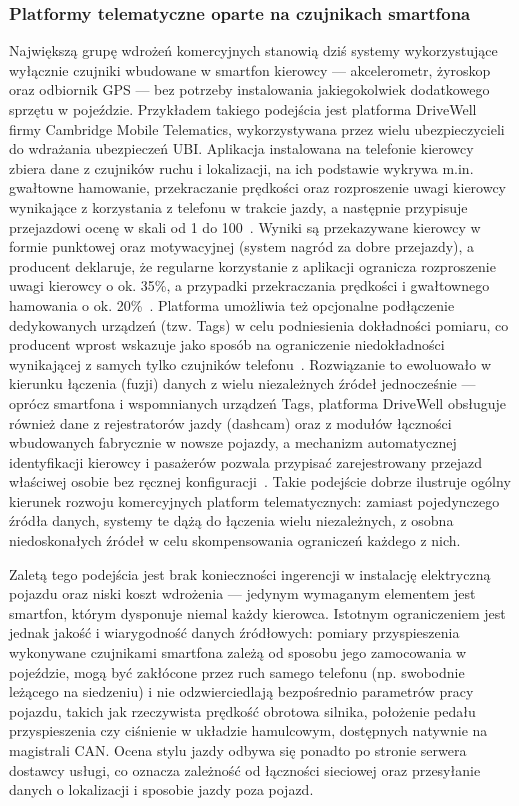 \subsubsection{Platformy telematyczne oparte na czujnikach smartfona}

Największą grupę wdrożeń komercyjnych stanowią dziś systemy wykorzystujące wyłącznie
czujniki wbudowane w smartfon kierowcy --- akcelerometr, żyroskop oraz odbiornik GPS ---
bez potrzeby instalowania jakiegokolwiek dodatkowego sprzętu w pojeździe. Przykładem
takiego podejścia jest platforma DriveWell firmy Cambridge Mobile Telematics,
wykorzystywana przez wielu ubezpieczycieli do wdrażania ubezpieczeń UBI. Aplikacja
instalowana na telefonie kierowcy zbiera dane z czujników ruchu i lokalizacji, na ich
podstawie wykrywa m.in. gwałtowne hamowanie, przekraczanie prędkości oraz rozproszenie
uwagi kierowcy wynikające z korzystania z telefonu w trakcie jazdy, a następnie
przypisuje przejazdowi ocenę w skali od 1 do 100~\cite{cmtelematics}. Wyniki są
przekazywane kierowcy w formie punktowej oraz motywacyjnej (system nagród za dobre
przejazdy), a producent deklaruje, że regularne korzystanie z aplikacji ogranicza
rozproszenie uwagi kierowcy o ok. 35\%, a przypadki przekraczania prędkości i
gwałtownego hamowania o ok. 20\%~\cite{cmtelematics}. Platforma umożliwia też
opcjonalne podłączenie dedykowanych urządzeń (tzw. Tags) w celu podniesienia
dokładności pomiaru, co producent wprost wskazuje jako sposób na ograniczenie
niedokładności wynikającej z samych tylko czujników telefonu~\cite{cmtelematics}.
Rozwiązanie to ewoluowało w kierunku łączenia (fuzji) danych z wielu niezależnych
źródeł jednocześnie --- oprócz smartfona i wspomnianych urządzeń Tags, platforma
DriveWell obsługuje również dane z rejestratorów jazdy (dashcam) oraz z modułów
łączności wbudowanych fabrycznie w nowsze pojazdy, a mechanizm automatycznej
identyfikacji kierowcy i pasażerów pozwala przypisać zarejestrowany przejazd
właściwej osobie bez ręcznej konfiguracji~\cite{cmtelematics}. Takie podejście dobrze
ilustruje ogólny kierunek rozwoju komercyjnych platform telematycznych: zamiast
pojedynczego źródła danych, systemy te dążą do łączenia wielu niezależnych, z osobna
niedoskonałych źródeł w celu skompensowania ograniczeń każdego z nich.

Zaletą tego podejścia jest brak konieczności ingerencji w instalację elektryczną
pojazdu oraz niski koszt wdrożenia --- jedynym wymaganym elementem jest smartfon,
którym dysponuje niemal każdy kierowca. Istotnym ograniczeniem jest jednak jakość
i wiarygodność danych źródłowych: pomiary przyspieszenia wykonywane czujnikami
smartfona zależą od sposobu jego zamocowania w pojeździe, mogą być zakłócone przez ruch
samego telefonu (np. swobodnie leżącego na siedzeniu) i nie odzwierciedlają bezpośrednio
parametrów pracy pojazdu, takich jak rzeczywista prędkość obrotowa silnika, położenie
pedału przyspieszenia czy ciśnienie w układzie hamulcowym, dostępnych natywnie na
magistrali CAN. Ocena stylu jazdy odbywa się ponadto po stronie serwera dostawcy usługi,
co oznacza zależność od łączności sieciowej oraz przesyłanie danych o lokalizacji
i sposobie jazdy poza pojazd.

